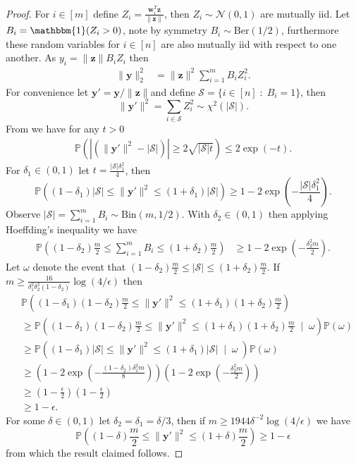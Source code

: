 \documentclass{article}
\theoremstyle{definition}
\renewcommand{\P}{\mathbb{P}}
\def\vw{{\bm{w}}}
\def\vy{{\bm{y}}}
\def\vz{{\bm{z}}}
\begin{document}
\begin{proof}
    For $i\in [m]$ define $Z_i = \tfrac{\vw_i^T\vz}{\| \vz \|}$, then $Z_i \sim \mathcal{N}(0,1)$ are mutually iid. Let $B_i = \mathbbm{1}(Z_i>0)$, note by symmetry $B_i \sim \text{Ber}(1/2)$, furthermore these random variables for $i \in [n]$ are also mutually iid with respect to one another. As $y_i = \| \vz \|B_i Z_i$ then
    \begin{align*}
    \| \vy \|_2^2 
    &= \| \vz \|^2 \sum_{i=1}^m B_i Z_i^2.
    \end{align*}
    For convenience let $\vy' = \vy / \| \vz\| $and define $\mathcal{S} = \{ i \in [n] \; : \; B_i = 1 \}$, then 
    \[
    \|\vy' \|^2 = \sum_{i\in \mathcal{S}} Z_i^2 \sim \chi^2(|\mathcal{S}|).
    \]
    From \cite[Lemma 1]{10.1214/aos/1015957395} we have for any $t>0$
    \begin{align*}
        \P \left( | \left(\| \vy'\|^2 - | \mathcal{S}| \right) | \geq 2 \sqrt{ |\mathcal{S}| t}   \right) \leq 2\exp(-t).
    \end{align*}
    For $\delta_1 \in (0,1)$ let $t=\tfrac{|\mathcal{S}| \delta_1^2}{4}$, then 
    \[
    \P \left( (1 - \delta_1)|\mathcal{S} | \leq \| \vy' \|^2 \leq (1 + \delta_1)|\mathcal{S} | \right) \geq 1 - 2 \exp \left( -\frac{|\mathcal{S}| \delta_1^2}{4}  \right).
    \] 
    Observe $|\mathcal{S}| = \sum_{i=1}^{m} B_i \sim \text{Bin}(m, 1/2)$. With $\delta_2 \in (0,1)$ then applying Hoeffding's inequality we have
    \begin{align*}
    \P\left( (1 - \delta_2) \frac{m}{2} \leq \sum_{i=1}^{m} B_i \leq (1 + \delta_2) \frac{m}{2}  \right) &\geq 1 - 2 \exp \left( -\frac{\delta_2^2 m}{2}\right).
    \end{align*}
    Let $\omega$ denote the event that $(1 - \delta_2)\tfrac{m}{2} \leq |\mathcal{S} | \leq (1 + \delta_2)\tfrac{m}{2}$. If $m \geq \frac{16}{\delta_1^2\delta_2^2 (1 - \delta_2 )} \log(4 / \epsilon)$ then
    \begin{align*}
        &\P\left((1 - \delta_1)(1- \delta_2)\frac{m}{2} \leq \| \vy' \|^2 \leq (1 + \delta_1)(1 + \delta_2)\frac{m}{2} \right)\\ &\geq \P\left((1 - \delta_1)(1- \delta_2)\frac{m}{2} \leq \| \vy' \|^2 \leq (1 + \delta_1)(1 + \delta_2)\frac{m}{2}\; \mid \; \omega\right) \P(\omega)\\
        &\geq  \P\left( (1 - \delta_1)|\mathcal{S} | \leq \| \vy'\|^2 \leq (1 + \delta_1)|\mathcal{S} | \; \mid \; \omega \;\right)\P(\omega)\\
        & \geq \left( 1 - 2 \exp \left( -\frac{(1 - \delta_2) \delta_1^2m}{8}  \right) \right) \left(1 - 2 \exp \left( -\frac{\delta_2^2 m}{2}\right) \right)\\
         & \geq \left( 1 - \frac{\epsilon}{2}\right)\left( 1 - \frac{\epsilon}{2}\right)\\
        & \geq 1 -\epsilon.
    \end{align*}
    For some $\delta \in (0,1)$ let $\delta_2 = \delta_1 = \delta/3$, then if $m \geq 1944\delta^{-2}\log(4 / \epsilon)$ we have
    \[
        \P\left((1 - \delta)\frac{m}{2} \leq \| \vy' \|^2 \leq (1 + \delta)\frac{m}{2} \right) \geq 1 - \epsilon
    \]
    from which the result claimed follows.
\end{proof}
\end{document}
